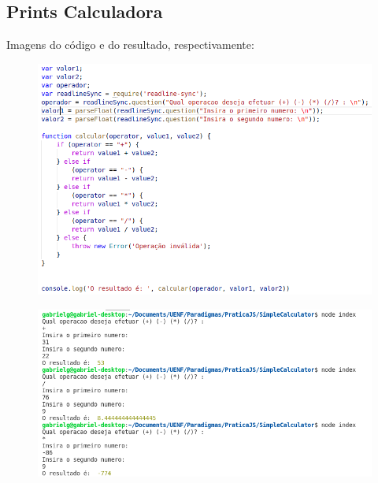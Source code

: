     \subsection{Prints Calculadora}
	
	Imagens do código e do resultado, respectivamente: 
	\begin{figure}[H]
		\centering
		\includegraphics[width=0.9\linewidth]{Pictures/CalcCode}
		\caption{}
		\label{fig:calccode}
	\end{figure}
	\begin{figure}[H]
		\centering
		\includegraphics[width=0.9\linewidth]{Pictures/CalcResult}
		\caption{}
		\label{fig:calcresult}
	\end{figure}
	



